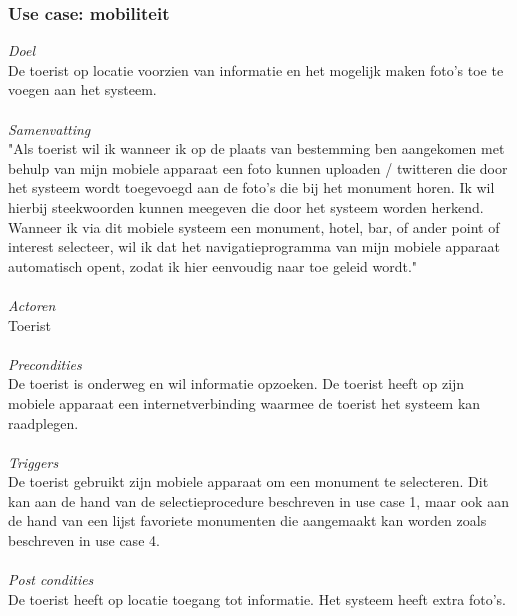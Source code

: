 \documentclass[a4paper,10pt]{article}
\newcommand{\rsubsubsection}[1]{
\subsubsection{#1}\label{sec:sub:sub:#1}
}
\begin{document}
			\rsubsubsection{Use case: mobiliteit}
			\textit{Doel}\\
			De toerist op locatie voorzien van informatie en het mogelijk maken foto's toe te voegen aan het systeem.\\ \\
			\textit{Samenvatting}\\
			"Als toerist wil ik wanneer ik op de plaats van bestemming ben aangekomen met behulp van mijn mobiele apparaat een foto kunnen uploaden / twitteren die door het systeem wordt toegevoegd aan de foto's die bij het monument horen. Ik wil hierbij steekwoorden kunnen meegeven die door het systeem worden herkend. Wanneer ik via dit mobiele systeem een monument, hotel, bar, of ander point of interest selecteer, wil ik dat het navigatieprogramma van mijn mobiele apparaat automatisch opent, zodat ik hier eenvoudig naar toe geleid wordt."\\ \\
			\textit{Actoren}\\
			Toerist\\ \\
			\textit{Precondities}\\
			De toerist is onderweg en wil informatie opzoeken. De toerist heeft op zijn mobiele apparaat een internetverbinding waarmee de toerist het systeem kan raadplegen.\\ \\
			\textit{Triggers}\\
			De toerist gebruikt zijn mobiele apparaat om een monument te selecteren. Dit kan aan de hand van de selectieprocedure beschreven in use case 1, maar ook aan de hand van een lijst favoriete monumenten die aangemaakt kan worden zoals beschreven in use case 4.\\ \\
			\textit{Post condities}\\
			De toerist heeft op locatie toegang tot informatie. Het systeem heeft extra foto's.	
			
\end{document}
